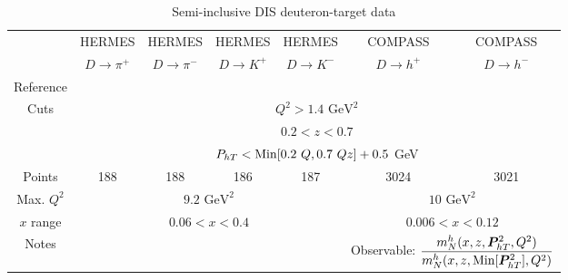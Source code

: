 \documentclass[aps,preprintnumbers,showpacs,nofootinbib,superscriptaddress,floatfix]{revtex4}
\newcommand{\Tperp}{T}
\begin{document}
\begin{table}[h]
\begin{center}
\begin{tabular}{|c|c|c|c|c|c|c|}
 \hline
  & HERMES & HERMES & HERMES & HERMES & COMPASS & COMPASS\\
 ~          &  $D \to \pi^+$    &   $D \to \pi^-$    &  $D \to K^+$    &   $D \to K^-$      &  $D \to h^+$    &   $D \to h^-$            \\
 \hline
 Reference & \multicolumn{4}{c|}{\cite{Airapetian:2012ki}}        &\multicolumn{2}{c|}{\cite{Adolph:2013stb}} \\
\hline
\multirow{3}{*}{Cuts}             & \multicolumn{6}{c|}{$Q^2 > 1.4 \text{ GeV}^2$}     \\
             & \multicolumn{6}{c|}{$0.2 <z <0.7$}     \\
             & \multicolumn{6}{c|}{$P_{h \Tperp}< {\rm Min}[0.2\ Q, 0.7 \ Q z ] +0.5$ GeV}     \\
\hline
 Points         &  188 & 188 & 186 & 187       &      3024    &   3021                 \\
 \hline
Max. $Q^2$      &  \multicolumn{4}{c|}{$9.2 \text{ GeV}^2 $}      & \multicolumn{2}{c|}{$10 \text{ GeV}^2 $}             \\
 \hline
$x$ range       & \multicolumn{4}{c|}{$0.06 < x < 0.4$ }    &  \multicolumn{2}{c|}{$0.006 < x < 0.12$ }             \\
\hline
Notes         &\multicolumn{4}{c|}{ }   & \multicolumn{2}{c|}{Observable: $\displaystyle \frac{m_N^h
    (x,z,\bm{P}_{h\Tperp}^2, Q^2)}{m_N^h (x,z,{\rm Min}[\bm{P}_{h\Tperp}^2], Q^2)}$}             \\
\hline 
\end{tabular}
\caption{Semi-inclusive DIS deuteron-target data}
\end{center}
\end{table}
\end{document}

